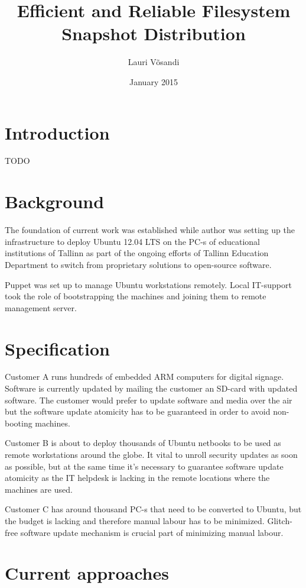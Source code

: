 \documentclass{article}
\title{Efficient and Reliable Filesystem Snapshot Distribution}
\author{Lauri Võsandi}
\date{January 2015}
\begin{document}
\maketitle

\section{Introduction}

TODO

\section{Background}

The foundation of current work was established while author was setting up
the infrastructure to deploy Ubuntu 12.04 LTS on the PC-s of educational
institutions of Tallinn as part of the ongoing efforts of Tallinn Education
Department to switch from proprietary solutions to open-source software.

Puppet was set up to manage Ubuntu workstations remotely. Local IT-support
took the role of bootstrapping the machines and joining them to remote
management server.


\section{Specification}

Customer A runs hundreds of embedded ARM computers for digital signage.
Software is currently updated by mailing the customer an SD-card with
updated software. The customer would prefer to update software and
media over the air but the software update atomicity has to be guaranteed
in order to avoid non-booting machines.

Customer B is about to deploy thousands of Ubuntu netbooks to be used as
remote workstations around the globe. It vital to unroll security updates
as soon as possible, but at the same time it's necessary to guarantee
software update atomicity as the IT helpdesk is lacking in the remote
locations where the machines are used.

Customer C has around thousand PC-s that need to be converted to Ubuntu,
but the budget is lacking and therefore manual labour has to be minimized.
Glitch-free software update mechanism is crucial part of minimizing manual
labour.

\section{Current approaches}
\end{document}
